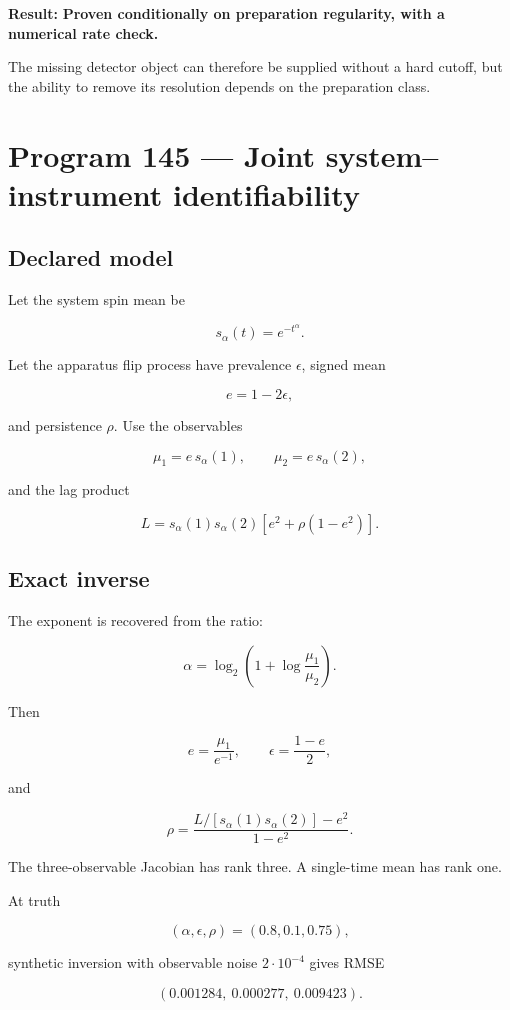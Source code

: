\documentclass[11pt,a4paper,openany]{report}
\begin{document}
\textbf{Result:} \textbf{Proven conditionally on preparation regularity, with a numerical rate check.}

The missing detector object can therefore be supplied without a hard cutoff, but the ability to remove its resolution depends on the preparation class.

\section{Program 145 --- Joint system--instrument identifiability}

\subsection{Declared model}

Let the system spin mean be

\[
s_\alpha(t)=e^{-t^\alpha}.
\]

Let the apparatus flip process have prevalence \(\epsilon\), signed mean

\[
e=1-2\epsilon,
\]

and persistence \(\rho\). Use the observables

\[
\mu_1=e\,s_\alpha(1),
\qquad
\mu_2=e\,s_\alpha(2),
\]

and the lag product

\[
L=s_\alpha(1)s_\alpha(2)
\left[e^2+\rho(1-e^2)\right].
\]

\subsection{Exact inverse}

The exponent is recovered from the ratio:

\[
\alpha
=
\log_2\left(
1+\log\frac{\mu_1}{\mu_2}
\right).
\]

Then

\[
e=\frac{\mu_1}{e^{-1}},
\qquad
\epsilon=\frac{1-e}{2},
\]

and

\[
\rho
=
\frac{
L/[s_\alpha(1)s_\alpha(2)]-e^2
}{
1-e^2
}.
\]

The three-observable Jacobian has rank three. A single-time mean has rank one.

At truth

\[
(\alpha,\epsilon,\rho)=(0.8,0.1,0.75),
\]

synthetic inversion with observable noise \(2\cdot10^{-4}\) gives RMSE

\[
(0.001284,\ 0.000277,\ 0.009423).
\]
\end{document}
